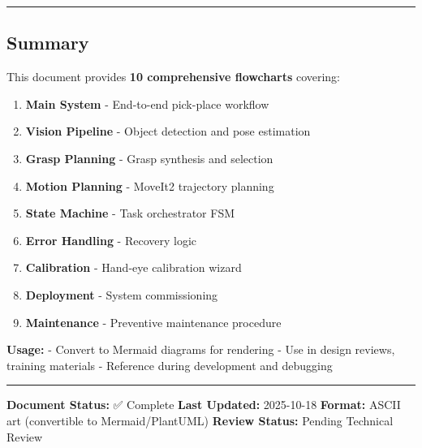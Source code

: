 \documentclass[
]{article}
\providecommand{\tightlist}{%
  \setlength{\itemsep}{0pt}\setlength{\parskip}{0pt}}
\begin{document}
\begin{center}\rule{0.5\linewidth}{0.5pt}\end{center}

\hypertarget{summary}{%
\subsection{Summary}\label{summary}}

This document provides \textbf{10 comprehensive flowcharts} covering:

\begin{enumerate}
\def\labelenumi{\arabic{enumi}.}
\tightlist
\item
  \textbf{Main System} - End-to-end pick-place workflow
\item
  \textbf{Vision Pipeline} - Object detection and pose estimation
\item
  \textbf{Grasp Planning} - Grasp synthesis and selection
\item
  \textbf{Motion Planning} - MoveIt2 trajectory planning
\item
  \textbf{State Machine} - Task orchestrator FSM
\item
  \textbf{Error Handling} - Recovery logic
\item
  \textbf{Calibration} - Hand-eye calibration wizard
\item
  \textbf{Deployment} - System commissioning
\item
  \textbf{Maintenance} - Preventive maintenance procedure
\end{enumerate}

\textbf{Usage:} - Convert to Mermaid diagrams for rendering - Use in
design reviews, training materials - Reference during development and
debugging

\begin{center}\rule{0.5\linewidth}{0.5pt}\end{center}

\textbf{Document Status:} ✅ Complete \textbf{Last Updated:} 2025-10-18
\textbf{Format:} ASCII art (convertible to Mermaid/PlantUML)
\textbf{Review Status:} Pending Technical Review
\end{document}
